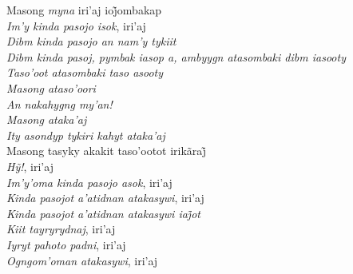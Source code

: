 \begin{linenumbers}\begingroup\raggedright
 \noindent Masong \emph{myna} iri’aj ioj̃ombakap\\
 \emph{Im'y kinda pasojo isok}, iri'aj\\
 \emph{Dibm kinda pasojo an nam'y tykiit}\\
 \emph{Dibm kinda pasoj, pymbak iasop a, ambyygn atasombaki dibm iasooty}\\
 \emph{Taso'oot atasombaki taso asooty}\\
 \emph{Masong ataso'oori}\\
 \emph{An nakahygng my'an!}\\
 \emph{Masong ataka'aj}\\
 \emph{Ity asondyp tykiri kahyt ataka'aj}\\
 Masong tasyky akakit taso’ootot irikãraj̃\\
 \emph{Hỹ!}, iri’aj\\
 \emph{Im'y'oma kinda pasojo asok}, iri'aj\\
 \emph{Kinda pasojot a'atidnan atakasywi}, iri'aj\\
 \emph{Kinda pasojot a’atidnan atakasywi iaj̃ot}\\
 \emph{Kiit tayryrydnaj}, iri'aj\\
 \emph{Iyryt pahoto padni}, iri'aj\\
 \emph{Ogngom'oman atakasywi}, iri'aj

\end{linenumbers}\endgroup

